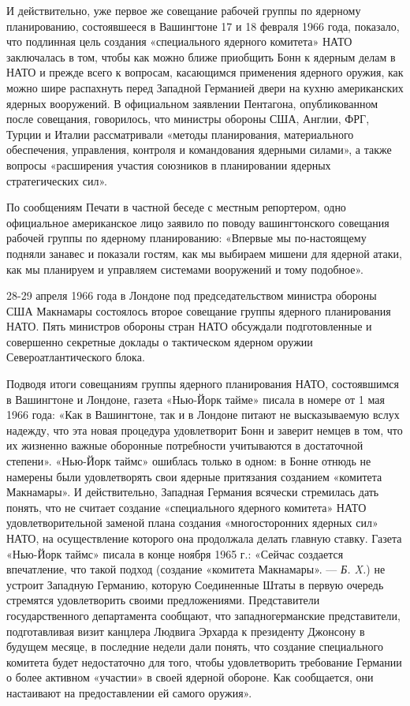 \documentclass[12pt, a4paper, openany]{book}
\begin{document}
	И действительно, уже первое же совещание рабочей группы по ядерному планированию, состоявшееся в Вашингтоне 17 и 18 февраля 1966 года, показало, что подлинная цель создания «специального ядерного комитета» НАТО заключалась в том, чтобы как можно ближе приобщить Бонн к ядерным делам в НАТО и прежде всего к вопросам, касающимся применения ядерного оружия, как можно шире распахнуть перед Западной Германией двери на кухню американских ядерных вооружений. В официальном заявлении Пентагона, опубликованном после совещания, говорилось, что министры обороны США, Англии, ФРГ, Турции и Италии рассматривали «методы планирования, материального обеспечения, управления, контроля и командования ядерными силами», а также вопросы «расширения участия союзников в планировании ядерных стратегических сил».
	
	По сообщениям Печати в частной беседе с местным репортером, одно официальное американское лицо заявило по поводу вашингтонского совещания рабочей группы по ядерному планированию: «Впервые мы по-настоящему подняли занавес и показали гостям, как мы выбираем мишени для ядерной атаки, как мы планируем и управляем системами вооружений и тому подобное».
	
	
	28-29 апреля 1966 года в Лондоне под председательством министра обороны США Макнамары состоялось второе совещание группы ядерного планирования НАТО. Пять министров обороны стран НАТО обсуждали подготовленные и совершенно секретные доклады о тактическом ядерном оружии Североатлантического блока.
	
	Подводя итоги совещаниям группы ядерного планирования НАТО, состоявшимся в Вашингтоне и Лондоне, газета «Нью-Йорк тайме» писала в номере от 1 мая 1966 года: «Как в Вашингтоне, так и в Лондоне питают не высказываемую вслух надежду, что эта новая процедура удовлетворит Бонн и заверит немцев в том, что их жизненно важные оборонные потребности учитываются в достаточной степени». «Нью-Йорк таймс» ошиблась только в одном: в Бонне отнюдь не намерены были удовлетворять свои ядерные притязания созданием «комитета Макнамары». И действительно, Западная Германия всячески стремилась дать понять, что не считает создание «специального ядерного комитета» НАТО удовлетворительной заменой плана создания «многосторонних ядерных сил» НАТО, на осуществление которого она продолжала делать главную ставку. Газета «Нью-Йорк таймс» писала в конце ноября 1965 г.: «Сейчас создается впечатление, что такой подход (создание «комитета Макнамары». — \textit{Б. X.}) не устроит Западную Германию, которую Соединенные Штаты в первую очередь стремятся удовлетворить своими предложениями. Представители государственного департамента сообщают, что западногерманские представители, подготавливая визит канцлера Людвига Эрхарда к президенту Джонсону в будущем месяце, в последние недели дали понять, что создание специального комитета будет недостаточно для того, чтобы удовлетворить требование Германии о более активном «участии» в своей ядерной обороне. Как сообщается, они настаивают на предоставлении ей самого оружия».
	
\end{document}
